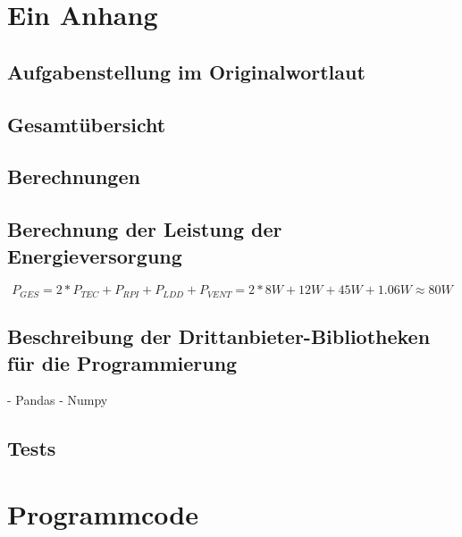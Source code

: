 \begin{appendix} %
\section{Ein Anhang}


\subsection{Aufgabenstellung im Originalwortlaut}


\subsection{Gesamtübersicht}


\subsection{Berechnungen}

\subsection{Berechnung der Leistung der Energieversorgung}
\begin{equation}
P_{GES} = 2*P_{TEC}+P_{RPI}+P_{LDD}+P_{VENT} = 2*8W+12W+45W+1.06W \approx 80W
    \label{formula:_calculation_sp_power}
\end{equation}

\subsection{Beschreibung der Drittanbieter-Bibliotheken für die Programmierung}
- Pandas
- Numpy

\label{section:_libraries_py}
\subsection{Tests}
\section{Programmcode}


\end{appendix}
